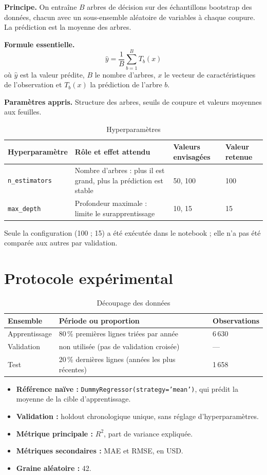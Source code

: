 \documentclass[11pt,a4paper]{article}
\begin{document}
\textbf{Principe.} On entraîne $B$ arbres de décision sur des échantillons bootstrap des données, chacun avec un sous-ensemble aléatoire de variables à chaque coupure. La prédiction est la moyenne des arbres.

\textbf{Formule essentielle.}
\begin{equation}
\hat y=\frac{1}{B}\sum_{b=1}^{B}T_b(x)
\end{equation}
où $\hat y$ est la valeur prédite, $B$ le nombre d'arbres, $x$ le vecteur de caractéristiques de l'observation et $T_b(x)$ la prédiction de l'arbre $b$.

\textbf{Paramètres appris.} Structure des arbres, seuils de coupure et valeurs moyennes aux feuilles.

\begin{table}[H]\centering\small
\caption{Hyperparamètres}
\begin{tabularx}{\textwidth}{@{}lXll@{}}
\toprule
Hyperparamètre & Rôle et effet attendu & Valeurs envisagées & Valeur retenue\\\midrule
\texttt{n\_estimators} & Nombre d'arbres : plus il est grand, plus la prédiction est stable & 50, 100 & 100\\
\texttt{max\_depth} & Profondeur maximale : limite le surapprentissage & 10, 15 & 15\\
\bottomrule
\end{tabularx}
\end{table}
Seule la configuration (100 ; 15) a été exécutée dans le notebook ; elle n'a pas été comparée aux autres par validation.

\section{Protocole expérimental}\label{sec:proto}
\begin{table}[H]\centering\small
\caption{Découpage des données}
\begin{tabular}{@{}lll@{}}
\toprule
Ensemble & Période ou proportion & Observations\\\midrule
Apprentissage & 80\,\% premières lignes triées par année & 6\,630\\
Validation & non utilisée (pas de validation croisée) & ---\\
Test & 20\,\% dernières lignes (années les plus récentes) & 1\,658\\
\bottomrule
\end{tabular}
\end{table}
\begin{itemize}[leftmargin=1.2em]
\item \textbf{Référence naïve :} \texttt{DummyRegressor(strategy='mean')}, qui prédit la moyenne de la cible d'apprentissage.
\item \textbf{Validation :} holdout chronologique unique, sans réglage d'hyperparamètres.
\item \textbf{Métrique principale :} $R^2$, part de variance expliquée.
\item \textbf{Métriques secondaires :} MAE et RMSE, en USD.
\item \textbf{Graine aléatoire :} 42.
\end{itemize}
\end{document}

